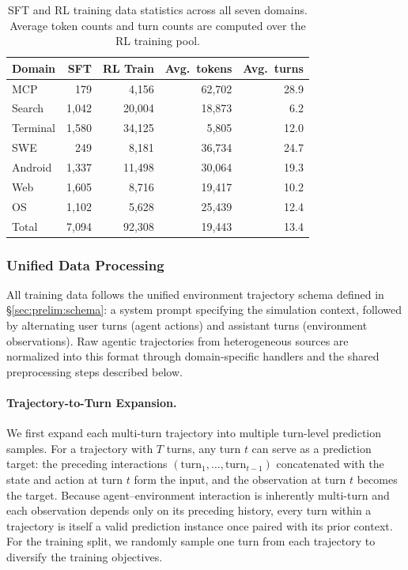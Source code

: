 \documentclass{llmxive}
\begin{document}
\begin{table}[!ht]
\centering
\small
\begin{tabular}{@{}lrrrr@{}}
\toprule
\textbf{Domain} & \textbf{SFT} & \textbf{RL Train} & \textbf{Avg.\ tokens} & \textbf{Avg.\ turns} \\
\midrule
MCP      & 179   & 4{,}156  & 62{,}702 & 28.9 \\
Search   & 1{,}042 & 20{,}004 & 18{,}873 & 6.2  \\
Terminal & 1{,}580 & 34{,}125 & 5{,}805  & 12.0 \\
SWE      & 249   & 8{,}181  & 36{,}734 & 24.7 \\
Android  & 1{,}337 & 11{,}498 & 30{,}064 & 19.3 \\
Web      & 1{,}605 & 8{,}716  & 19{,}417 & 10.2 \\
OS       & 1{,}102 & 5{,}628  & 25{,}439 & 12.4 \\
\midrule
Total & 7{,}094 & 92{,}308 & 19{,}443 & 13.4 \\
\bottomrule
\end{tabular}
\caption{SFT and RL training data statistics across all seven domains. Average token counts and turn counts are computed over the RL training pool.}
\label{tab:data_stats}
\end{table}

\subsubsection{Unified Data Processing}

All training data follows the unified environment trajectory schema defined in \S\ref{sec:prelim:schema}: a system prompt specifying the simulation context, followed by alternating user turns (agent actions) and assistant turns (environment observations).
Raw agentic trajectories from heterogeneous sources are normalized into this format through domain-specific handlers and the shared preprocessing steps described below.

\paragraph{Trajectory-to-Turn Expansion.}
We first expand each multi-turn trajectory into multiple turn-level prediction samples.
For a trajectory with $T$ turns, any turn $t$ can serve as a prediction target: the preceding interactions $(\text{turn}_1, \ldots, \text{turn}_{t-1})$ concatenated with the state and action at turn $t$ form the input, and the observation at turn $t$ becomes the target.
Because agent--environment interaction is inherently multi-turn and each observation depends only on its preceding history, every turn within a trajectory is itself a valid prediction instance once paired with its prior context.
For the training split, we randomly sample one turn from each trajectory to diversify the training objectives.
\end{document}

